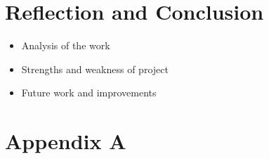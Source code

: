 \documentclass[11pt,a4paper]{article}
\begin{document}
\newpage
\section{Reflection and Conclusion}
\begin{itemize}
    \item Analysis of the work
    \item Strengths and weakness of project
    \item Future work and improvements
\end{itemize}


\newpage
{} %

\newpage



\newpage
%
%
\appendix
\section*{Appendix A}
\end{document}
